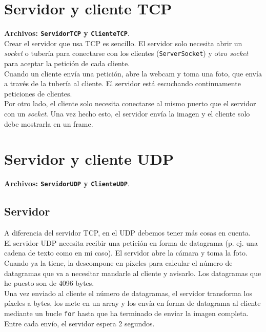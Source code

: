 \documentclass[11pt,a4paper]{article}
\begin{document}
\newpage

\section{Servidor y cliente TCP}

\color{deepgreen}\textbf{Archivos: \texttt{ServidorTCP} y \texttt{ClienteTCP}}.\color{black}\\

Crear el servidor que usa TCP es sencillo. El servidor solo necesita abrir un \textit{socket} o tubería para conectarse con los clientes (\texttt{ServerSocket}) y otro \textit{socket} para aceptar la petición de cada cliente.\\

Cuando un cliente envía una petición, abre la webcam y toma una foto, que envía a través de la tubería al cliente. El servidor está escuchando continuamente peticiones de clientes.\\

Por otro lado, el cliente solo necesita conectarse al mismo puerto que el servidor con un \textit{socket}. Una vez hecho esto, el servidor envía la imagen y el cliente solo debe mostrarla en un frame.

\section{Servidor y cliente UDP}

\color{deepgreen}\textbf{Archivos: \texttt{ServidorUDP} y \texttt{ClienteUDP}}.\color{black}

\subsection{Servidor}

A diferencia del servidor TCP, en el UDP debemos tener más cosas en cuenta.\\

El servidor UDP necesita recibir una petición en forma de datagrama (p. ej. una cadena de texto como en mi caso).  El servidor abre la cámara y toma la foto.\\

Cuando ya la tiene, la descompone en píxeles para calcular el número de datagramas que va a necesitar mandarle al cliente y avisarlo. Los datagramas que he puesto son de 4096 bytes.\\

Una vez enviado al cliente el número de datagramas, el servidor transforma los píxeles a bytes, los mete en un array y los envía en forma de datagrama al cliente mediante un bucle \texttt{for} hasta que ha terminado de enviar la imagen completa. Entre cada envío, el servidor espera 2 segundos.
\end{document}
